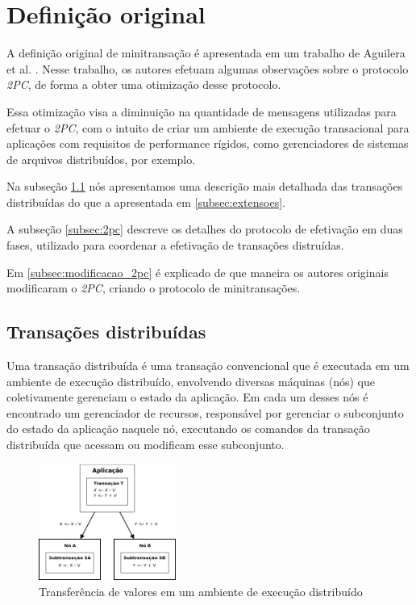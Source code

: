\documentclass[11pt,twoside,a4paper]{book}
\begin{document}
\section{Definição original}
\label{sec:minitransacao_original}
A definição original de minitransação é apresentada em um trabalho de Aguilera et al. \cite{sinfonia}. Nesse trabalho, os autores efetuam algumas observações sobre o protocolo \emph{2PC}, de forma a obter uma otimização desse protocolo. 

Essa otimização visa a diminuição na quantidade de mensagens utilizadas para efetuar o \emph{2PC}, com o intuito de criar um ambiente de execução transacional para aplicações com requisitos de performance rígidos, como gerenciadores de sistemas de arquivos distribuídos, por exemplo. 

Na subseção \ref{subsec:transacoes_distribuidas} nós apresentamos uma descrição mais detalhada das transações distribuídas do que a apresentada em \ref{subsec:extensoes}.

A subseção \ref{subsec:2pc} descreve os detalhes do protocolo de efetivação em duas fases, utilizado para coordenar a efetivação de transações distruídas.

Em \ref{subsec:modificacao_2pc} é explicado de que maneira os autores originais modificaram o \emph{2PC}, criando o protocolo de minitransações.

\subsection{Transações distribuídas}
\label{subsec:transacoes_distribuidas}
Uma transação distribuída é uma transação convencional que é executada em um ambiente de execução distribuído, envolvendo diversas máquinas (nós) que coletivamente gerenciam o estado da aplicação. Em cada um desses nós é encontrado um gerenciador de recursos, responsável por gerenciar o subconjunto do estado da aplicação naquele nó, executando os comandos da transação distribuída que acessam ou modificam esse subconjunto.

\begin{figure}
  \centering
  \includegraphics[width=0.4\textwidth]{transferencia_valores_distribuido} 
  \caption{Transferência de valores em um ambiente de execução distribuído}
  \label{fig:transferencia_valores_distribuido} 
\end{figure}
\end{document}
